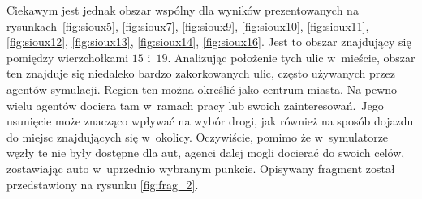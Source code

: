 \documentclass[twoside,12pt]{report}
\begin{document}
Ciekawym jest jednak obszar wspólny dla wyników prezentowanych na rysunkach~\ref{fig:sioux5}, \ref{fig:sioux7}, \ref{fig:sioux9}, \ref{fig:sioux10}, \ref{fig:sioux11}, \ref{fig:sioux12}, \ref{fig:sioux13}, \ref{fig:sioux14}, \ref{fig:sioux16}. Jest to obszar znajdujący się pomiędzy wierzchołkami $15$ i~$19$. Analizując położenie tych ulic w~mieście, obszar ten znajduje się niedaleko bardzo zakorkowanych ulic, często używanych przez agentów symulacji. Region ten można określić jako centrum miasta. Na pewno wielu agentów dociera tam w~ramach pracy lub swoich zainteresowań.~Jego usunięcie może znacząco wpływać na wybór drogi, jak również na sposób dojazdu do miejsc znajdujących się w~okolicy. Oczywiście, pomimo że w~symulatorze węzły te nie były dostępne dla aut, agenci dalej mogli docierać do swoich celów, zostawiając auto w~uprzednio wybranym punkcie. Opisywany fragment został przedstawiony na rysunku \ref{fig:frag_2}.
\end{document}
